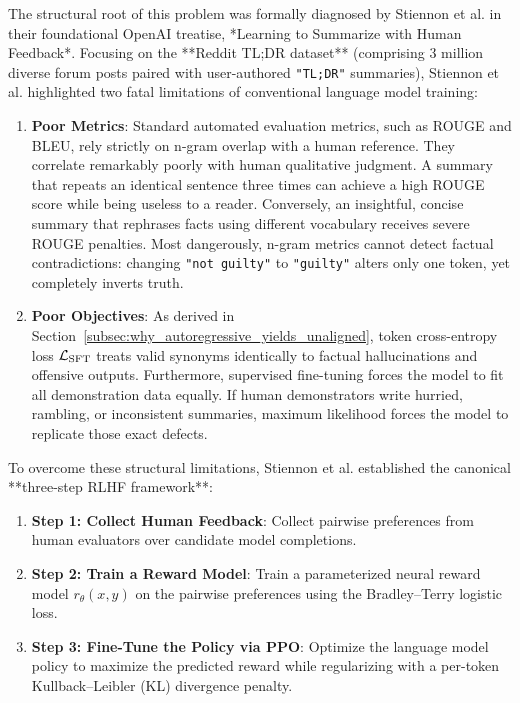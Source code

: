 \documentclass[../../../main.tex]{subfiles}
\begin{document}
The structural root of this problem was formally diagnosed by Stiennon et al. \citep{stiennon2020} in their foundational OpenAI treatise, *Learning to Summarize with Human Feedback*. Focusing on the **Reddit TL;DR dataset** (comprising 3 million diverse forum posts paired with user-authored \texttt{"TL;DR"} summaries), Stiennon et al. highlighted two fatal limitations of conventional language model training:
\begin{enumerate}
    \item \textbf{Poor Metrics}: Standard automated evaluation metrics, such as ROUGE and BLEU, rely strictly on n-gram overlap with a human reference. They correlate remarkably poorly with human qualitative judgment. A summary that repeats an identical sentence three times can achieve a high ROUGE score while being useless to a reader. Conversely, an insightful, concise summary that rephrases facts using different vocabulary receives severe ROUGE penalties. Most dangerously, n-gram metrics cannot detect factual contradictions: changing \texttt{"not guilty"} to \texttt{"guilty"} alters only one token, yet completely inverts truth.
    \item \textbf{Poor Objectives}: As derived in Section~\ref{subsec:why_autoregressive_yields_unaligned}, token cross-entropy loss $\mathcal{L}_{\text{SFT}}$ treats valid synonyms identically to factual hallucinations and offensive outputs. Furthermore, supervised fine-tuning forces the model to fit all demonstration data equally. If human demonstrators write hurried, rambling, or inconsistent summaries, maximum likelihood forces the model to replicate those exact defects.
\end{enumerate}

To overcome these structural limitations, Stiennon et al. established the canonical **three-step RLHF framework**:
\begin{enumerate}
    \item \textbf{Step 1: Collect Human Feedback}: Collect pairwise preferences from human evaluators over candidate model completions.
    \item \textbf{Step 2: Train a Reward Model}: Train a parameterized neural reward model $r_\theta(x, y)$ on the pairwise preferences using the Bradley--Terry logistic loss.
    \item \textbf{Step 3: Fine-Tune the Policy via PPO}: Optimize the language model policy to maximize the predicted reward while regularizing with a per-token Kullback--Leibler (KL) divergence penalty.
\end{enumerate}
\end{document}
